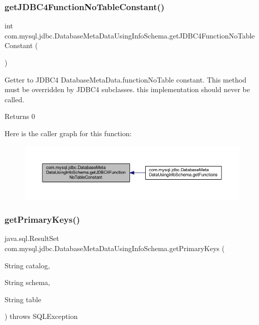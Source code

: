 \subsubsection{\texorpdfstring{get\+J\+D\+B\+C4\+Function\+No\+Table\+Constant()}{getJDBC4FunctionNoTableConstant()}}
{\footnotesize\ttfamily int com.\+mysql.\+jdbc.\+Database\+Meta\+Data\+Using\+Info\+Schema.\+get\+J\+D\+B\+C4\+Function\+No\+Table\+Constant (\begin{DoxyParamCaption}{ }\end{DoxyParamCaption})\hspace{0.3cm}{\ttfamily [protected]}}

Getter to J\+D\+B\+C4 Database\+Meta\+Data.\+function\+No\+Table constant. This method must be overridden by J\+D\+B\+C4 subclasses. this implementation should never be called.

\begin{DoxyReturn}{Returns}
0 
\end{DoxyReturn}
Here is the caller graph for this function\+:
\nopagebreak
\begin{figure}[H]
\begin{center}
\leavevmode
\includegraphics[width=350pt]{classcom_1_1mysql_1_1jdbc_1_1_database_meta_data_using_info_schema_a29cf035125a66f19f874935b8cc8138a_icgraph}
\end{center}
\end{figure}
\mbox{\label{classcom_1_1mysql_1_1jdbc_1_1_database_meta_data_using_info_schema_a65812af65021eed61d345630af494ca3}} 
\subsubsection{\texorpdfstring{get\+Primary\+Keys()}{getPrimaryKeys()}}
{\footnotesize\ttfamily java.\+sql.\+Result\+Set com.\+mysql.\+jdbc.\+Database\+Meta\+Data\+Using\+Info\+Schema.\+get\+Primary\+Keys (\begin{DoxyParamCaption}\item[{String}]{catalog,  }\item[{String}]{schema,  }\item[{String}]{table }\end{DoxyParamCaption}) throws S\+Q\+L\+Exception}

